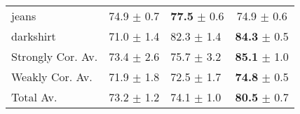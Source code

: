\documentclass[10pt,twocolumn,letterpaper]{article}
\begin{document}
\begin{table}[t]
\begin{tabular}{p{2cm} P{1.8cm} P{1.7cm} c}
			jeans& 74.9 $\pm$ 0.7 & \textbf{77.5} $\pm$  0.6 & 74.9 $\pm$ 0.6\\
			darkshirt& 71.0 $\pm$ 1.4 & 82.3 $\pm$ 1.4 & \textbf{84.3} $\pm$ 0.5\\
			\midrule
			Strongly Cor. Av. & 73.4  $\pm$ 2.6  & 75.7 $\pm$ 3.2 & \textbf{85.1} $\pm$ 1.0 \\
			Weakly Cor. Av. & 71.9 $\pm$ 1.8 & 72.5 $\pm$ 1.7 &  \textbf{74.8} $\pm$ 0.5 \\
			Total Av. & 73.2 $\pm$ 1.2 & 74.1 $\pm$ 1.0 & \textbf{80.5} $\pm$ 0.7 \\
			\bottomrule
		\end{tabular}%
		\label{tab:VIPeR}%
	\end{table}%
	
	
%	
\end{document}
